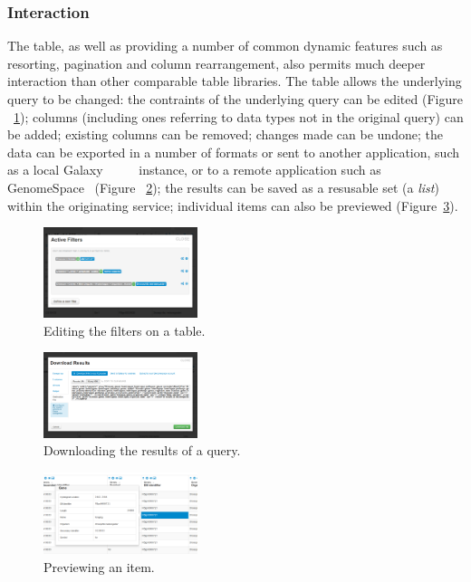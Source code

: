 \documentclass[10pt,a4paper,twocolumn]{article}
\begin{document}
\subsubsection*{Interaction}

The table, as well as providing a number of common dynamic features such as
resorting, pagination and column rearrangement, also permits much deeper
interaction than other comparable table libraries. The table allows the
underlying query to be changed: the contraints of the underlying query can be
edited (Figure ~\ref{fig:edit-filters}); columns (including ones referring to
data types not in the original query) can be added; existing columns can be
removed; changes made can be undone; the data can be exported in a number of
formats or sent to another application, such as a local Galaxy
~\cite{goecks2010galaxy} ~\cite{blankenberg2010galaxy}
~\cite{giardine2005galaxy} instance, or to a remote application such as
GenomeSpace~\cite{genomespace} (Figure ~\ref{fig:export}); the results can be
saved as a resusable set (a \emph{list}) within the originating service;
individual items can also be previewed (Figure~\ref{fig:preview}).

\begin{figure}[htb]
\centering
\includegraphics[width=0.4\textwidth]{table-edit-filters.png}
\caption{\label{fig:edit-filters} Editing the filters on a table.}
\end{figure}

\begin{figure}[htb]
\centering
\includegraphics[width=0.4\textwidth]{table-download.png}
\caption{\label{fig:export} Downloading the results of a query.}
\end{figure}

\begin{figure}[htb]
\centering
\includegraphics[width=0.4\textwidth]{preview-gene.png}
\caption{\label{fig:preview} Previewing an item.}
\end{figure}
\end{document}
